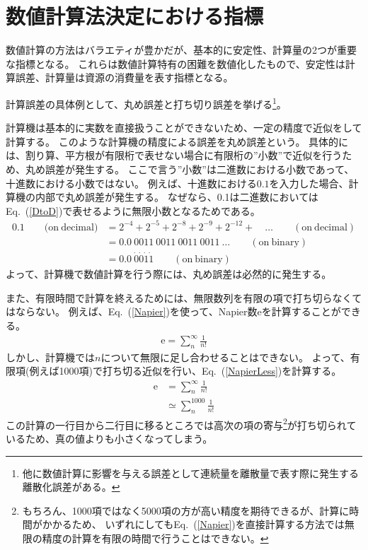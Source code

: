 \documentclass[autodetect-engine,dvipdfmx-if-dvi,ja=standard,a4paper,layout=v2]{bxjsreport}
\newcommand{\eref}[1]{Eq.~(\ref{#1})}
\begin{document}
    \section{数値計算法決定における指標}
    数値計算の方法はバラエティが豊かだが、基本的に安定性、計算量の2つが重要な指標となる。
    これらは数値計算特有の困難を数値化したもので、安定性は計算誤差、計算量は資源の消費量を表す指標となる。\par
    計算誤差の具体例として、丸め誤差と打ち切り誤差を挙げる\footnote{
      他に数値計算に影響を与える誤差として連続量を離散量で表す際に発生する離散化誤差がある。
    }。\par
    計算機は基本的に実数を直接扱うことができないため、一定の精度で近似をして計算する。
    このような計算機の精度による誤差を丸め誤差という。
    具体的には、割り算、平方根が有限桁で表せない場合に有限桁の”小数”で近似を行うため、丸め誤差が発生する。
    ここで言う”小数”は二進数における小数であって、十進数における小数ではない。
    例えば、十進数における$0.1$を入力した場合、計算機の内部で丸め誤差が発生する。
    なぜなら、0.1は二進数においては\eref{DtoD}で表せるように無限小数となるためである。
    \begin{align}
      0.1 \qquad \mathrm{(on \: decimal})
      &= 2^{-4} + 2^{-5} + 2^{-8} + 2^{-9} + 2^{-12} + \quad \dots \qquad\mathrm{(on \: decimal)} \nonumber\\
      &=0.0\: 0011 \: 0011 \: 0011 \: 0011 \: \dots \qquad \mathrm{(on \: binary)} \nonumber\\
      &=0.0\: \dot{0} \dot{0} \dot{1} \dot{1} \qquad \mathrm{(on \: binary)}\label{DtoD}
    \end{align}
    よって、計算機で数値計算を行う際には、丸め誤差は必然的に発生する。\par
    また、有限時間で計算を終えるためには、無限数列を有限の項で打ち切らなくてはならない。
    例えば、\eref{Napier}を使って、Napier数$\mathrm{e}$を計算することができる。
    \begin{align}
      \mathrm{e} = \sum_{n}^{\infty} \frac{1}{n!} \label{Napier}
    \end{align}
    しかし、計算機では$n$について無限に足し合わせることはできない。
    よって、有限項(例えば1000項)で打ち切る近似を行い、\eref{NapierLess}を計算する。
    \begin{align}
      \mathrm{e} &= \sum_{n}^{\infty} \frac{1}{n!} \nonumber\\
      &\simeq \sum_{n}^{1000} \frac{1}{n!} \label{NapierLess}
    \end{align}
    この計算の一行目から二行目に移るところでは高次の項の寄与\footnote{
    もちろん、1000項ではなく5000項の方が高い精度を期待できるが、計算に時間がかかるため、
    いずれにしても\eref{Napier}を直接計算する方法では無限の精度の計算を有限の時間で行うことはできない。
    }が打ち切られているため、真の値よりも小さくなってしまう。
\end{document}
